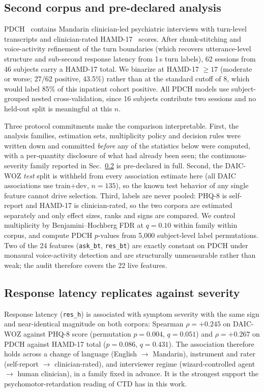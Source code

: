 \documentclass{article}
\begin{document}
\subsection{Second corpus and pre-declared analysis}
\label{sec:audit-protocol}
PDCH~\cite{TODO-pdch} contains Mandarin clinician-led psychiatric interviews with turn-level transcripts and clinician-rated HAMD-17~\cite{TODO-hamd} scores. After chunk-stitching and voice-activity refinement of the turn boundaries (which recovers utterance-level structure and sub-second response latency from 1\,s turn labels), 62 sessions from 46 subjects carry a HAMD-17 total. We binarize at HAMD-17 $\geq 17$ (moderate or worse; 27/62 positive, 43.5\%) rather than at the standard cutoff of 8, which would label 85\% of this inpatient cohort positive. All PDCH models use subject-grouped nested cross-validation, since 16 subjects contribute two sessions and no held-out split is meaningful at this $n$.

Three protocol commitments make the comparison interpretable. First, the analysis families, estimation sets, multiplicity policy and decision rules were written down and committed \emph{before} any of the statistics below were computed, with a per-quantity disclosure of what had already been seen; the continuous-severity family reported in Sec.~\ref{sec:audit-latency} is pre-declared in full. Second, the DAIC-WOZ \emph{test} split is withheld from every association estimate here (all DAIC associations use train+dev, $n{=}135$), so the known test behavior of any single feature cannot drive selection. Third, labels are never pooled: PHQ-8 is self-report and HAMD-17 is clinician-rated, so the two corpora are estimated separately and only effect sizes, ranks and signs are compared. We control multiplicity by Benjamini--Hochberg FDR at $q{=}0.10$ within family within corpus, and compute PDCH $p$-values from 5{,}000 subject-level label permutations. Two of the 24 features (\texttt{ask\_bt}, \texttt{res\_bt}) are exactly constant on PDCH under monaural voice-activity detection and are structurally unmeasurable rather than weak; the audit therefore covers the 22 live features.

\subsection{Response latency replicates against severity}
\label{sec:audit-latency}
Response latency (\texttt{res\_h}) is associated with symptom severity with the same sign and near-identical magnitude on both corpora: Spearman $\rho = +0.245$ on DAIC-WOZ against PHQ-8 score (permutation $p = 0.004$, $q = 0.051$) and $\rho = +0.267$ on PDCH against HAMD-17 total ($p = 0.086$, $q = 0.431$). The association therefore holds across a change of language (English $\rightarrow$ Mandarin), instrument and rater (self-report $\rightarrow$ clinician-rated), and interviewer regime (wizard-controlled agent $\rightarrow$ human clinician), in a family fixed in advance. It is the strongest support the psychomotor-retardation reading of CTD has in this work.
\end{document}
